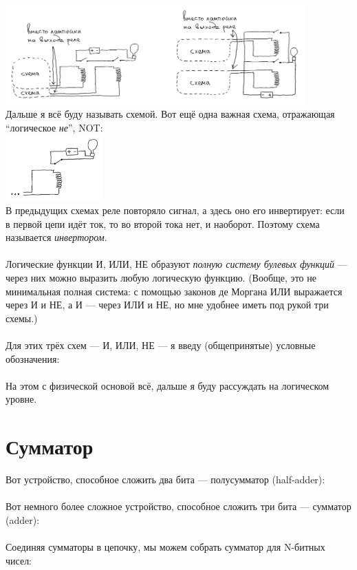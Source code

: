 \documentclass[11pt]{book}
\begin{document}
\\
\includegraphics[height=1.5in]{pic/16.png}
\\
Дальше я всё буду называть схемой. Вот ещё одна важная схема, отражающая ``логическое \emph{не}'', NOT:
\\
\includegraphics[height=1in]{pic/17.png}
\\
В предыдущих схемах реле повторяло сигнал, а здесь оно его инвертирует: если в первой цепи идёт ток, то во второй тока нет, и наоборот.
Поэтому схема называется \emph{инвертором}.
\\ \\
Логические функции И, ИЛИ, НЕ образуют \emph{полную систему булевых функций} --- через них можно выразить любую логическую функцию.
(Вообще, это не минимальная полная система: с помощью законов де Моргана ИЛИ выражается через И и НЕ, а И --- через ИЛИ и НЕ,
но мне удобнее иметь под рукой три схемы.)
\\ \\
Для этих трёх схем --- И, ИЛИ, НЕ --- я введу (общепринятые) условные обозначения:
\\
\\
На этом с физической основой всё, дальше я буду рассуждать на логическом уровне.

\section{Сумматор}
Вот устройство, способное сложить два бита --- полусумматор (half-adder):
\\
\\
Вот немного более сложное устройство, способное сложить три бита --- сумматор (adder):
\\
\\
Соединяя сумматоры в цепочку, мы можем собрать сумматор для N-битных чисел:
\\
\\
\end{document}
